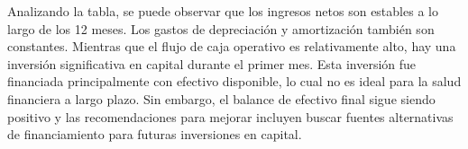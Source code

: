 

Analizando la tabla, se puede observar que los ingresos netos son estables a lo largo de los 12 meses. Los gastos de depreciación y amortización también son constantes. Mientras que el flujo de caja operativo es relativamente alto, hay una inversión significativa en capital durante el primer mes. Esta inversión fue financiada principalmente con efectivo disponible, lo cual no es ideal para la salud financiera a largo plazo. Sin embargo, el balance de efectivo final sigue siendo positivo y las recomendaciones para mejorar incluyen buscar fuentes alternativas de financiamiento para futuras inversiones en capital.